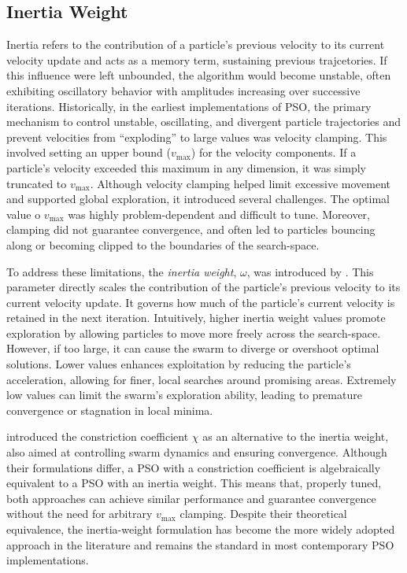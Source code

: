 {\subsection{Inertia Weight}

Inertia refers to the contribution of a particle's previous velocity to its current velocity update and acts as a memory term, sustaining previous trajcetories. If this influence were left unbounded, the algorithm would become unstable, often exhibiting oscillatory behavior with amplitudes increasing over successive iterations.
Historically, in the earliest implementations of PSO, the primary mechanism to control unstable, oscillating, and divergent particle trajectories and prevent velocities from ``exploding'' to large values was velocity clamping. This involved setting an upper bound ($v_{\text{max}}$) for the velocity components. If a particle's velocity exceeded this maximum in any dimension, it was simply truncated to $v_{\text{max}}$. Although velocity clamping helped limit excessive movement and supported global exploration, it introduced several challenges. The optimal value o $v_{\text{max}}$ was highly problem-dependent and difficult to tune. Moreover, clamping did not guarantee convergence, and often led to particles bouncing along or becoming clipped to the boundaries of the \gls{search-space}.

To address these limitations, the \textit{inertia weight}, $\omega$, was introduced by \citeauthor{shi1998modified} \parencite*{shi1998modified,shi1999empirical}. This parameter directly scales the contribution of the particle's previous velocity to its current velocity update. It governs how much of the particle's current velocity is retained in the next iteration. Intuitively, higher inertia weight values promote exploration by allowing particles to move more freely across the \gls{search-space}. However, if too large, it can cause the swarm to diverge or overshoot optimal solutions.
Lower values  enhances exploitation by reducing the particle's acceleration, allowing for finer, local searches around promising areas.  Extremely low values can limit the swarm's exploration ability, leading to premature convergence or stagnation in local minima.

\citet{clerc2002particle} introduced the constriction coefficient $\chi$ as an alternative to the inertia weight, also aimed at controlling swarm dynamics and ensuring convergence. Although their formulations differ, a PSO with a constriction coefficient is algebraically equivalent to a PSO with an inertia weight. This means that, properly tuned, both approaches can achieve similar performance and guarantee convergence without the need for arbitrary $v_{\text{max}}$ clamping. Despite their theoretical equivalence, the inertia-weight formulation has become the more widely adopted approach in the literature and remains the standard in most contemporary PSO implementations.

}
